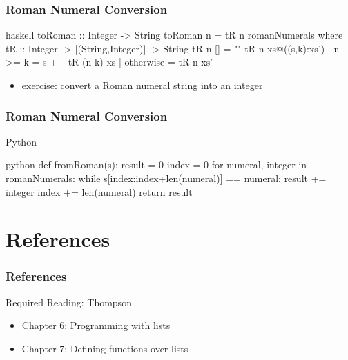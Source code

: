 \documentclass[dvipsnames]{beamer}
\theoremstyle{plain}
\begin{document}
\begin{frame}[fragile]
  \frametitle{Roman Numeral Conversion}

  \begin{exampleblock}{}
    \begin{pygments}{haskell}
toRoman :: Integer -> String
toRoman n = tR n romanNumerals
  where
    tR :: Integer -> [(String,Integer)] -> String
    tR n []             = ""
    tR n xs@((s,k):xs')
      | n >= k    = s ++ tR (n-k) xs
      | otherwise = tR n xs'
    \end{pygments}
  \end{exampleblock}

  \pause
  \begin{itemize}
    \item exercise: convert a Roman numeral string into an integer
  \end{itemize}
\end{frame}

\begin{frame}[fragile]
  \frametitle{Roman Numeral Conversion}

  \begin{exampleblock}{Python}
    \begin{pygments}{python}
def fromRoman(s):
    result = 0
    index = 0
    for numeral, integer in romanNumerals:
        while s[index:index+len(numeral)] == numeral:
            result += integer
            index += len(numeral)
    return result
    \end{pygments}
  \end{exampleblock}
\end{frame}

\section*{References}

\begin{frame}
  \frametitle{References}

  \begin{block}{Required Reading: Thompson}
    \begin{itemize}
      \item Chapter 6: \alert{Programming with lists}
      \item Chapter 7: \alert{Defining functions over lists}
    \end{itemize}
  \end{block}
\end{frame}
\end{document}
